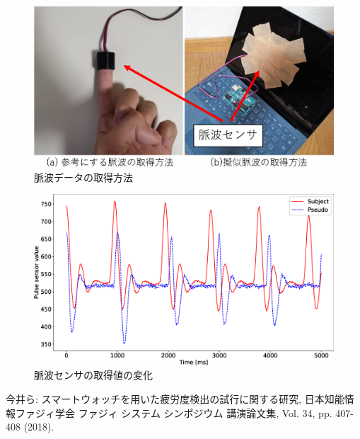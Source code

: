 \documentclass[a4j]{jarticle}%
\begin{document}
\begin{figure}[!t]
  \begin{center}
    \includegraphics[width=1\linewidth]{sensors.eps}
  \end{center}
  \vspace{-8mm}
  \caption{脈波データの取得方法}
  \label{fig:sensors}
\end{figure}

\begin{figure}[!t]
  \begin{center}
    \includegraphics[width=1\linewidth]{pulse.eps}
  \end{center}
  \vspace{-8mm}
  \caption{脈波センサの取得値の変化}
  \label{fig:pulse}
\end{figure}


\begin{thebibliography}{3}

   今井ら: スマートウォッチを用いた疲労度検出の試行に関する研究, 日本知能情報ファジィ学会 ファジィ システム シンポジウム 講演論文集, Vol. 34, pp. 407-408 (2018).
\end{thebibliography}
\end{document}
